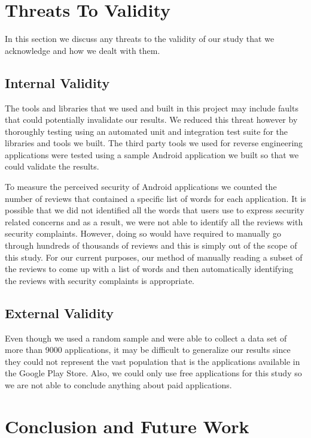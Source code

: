 \documentclass{sig-alternate}
\begin{document}
\section{Threats To Validity}

In this section we discuss any threats to the validity of our study that we acknowledge and how we dealt with them.

\subsection{Internal Validity}

The tools and libraries that we used and built in this project may include faults that could potentially invalidate our results. We reduced this threat however by thoroughly testing using an automated unit and integration test suite for the libraries and tools we built. The third party tools we used for reverse engineering applications were tested using a sample Android application we built so that we could validate the results.

To measure the perceived security of Android applications we counted the number of reviews that contained a specific list of words for each application. It is possible that we did not identified all the words that users use to express security related concerns and as a result, we were not able to identify all the reviews with security complaints. However, doing so would have required to manually go through hundreds of thousands of reviews and this is simply out of the scope of this study. For our current purposes, our method of manually reading a subset of the reviews to come up with a list of words and then automatically identifying the reviews with security complaints is appropriate.

\subsection{External Validity}

Even though we used a random sample and were able to collect a data set of more than 9000 applications, it may be difficult to generalize our results since they could not represent the vast population that is the applications available in the Google Play Store. Also, we could only use free applications for this study so we are not able to conclude anything about paid applications.

\section{Conclusion and Future Work}
\end{document}
